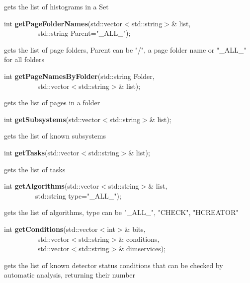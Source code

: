  gets the list of histograms in a Set


\item    int {\bf getPageFolderNames}(std::vector$<$std::string$>$\& list,\\\mbox{}~~~~~~~~~ std::string Parent="\_ALL\_");


 gets the list of page folders, Parent can be "/", a page folder name or "\_ALL\_" for all folders  


\item    int {\bf getPageNamesByFolder}(std::string Folder,\\\mbox{}~~~~~~~~~
			   std::vector$<$std::string$>$\& list);

 gets the list of pages in a folder


\item    int {\bf getSubsystems}(std::vector$<$std::string$>$\& list);


 gets the list of known subsystems


\item    int {\bf getTasks}(std::vector$<$std::string$>$\& list);


 gets the list of tasks


\item    int {\bf getAlgorithms}(std::vector$<$std::string$>$\& list,\\\mbox{}~~~~~~~~~std::string type="\_ALL\_");


 gets the list of algorithms, type can be "\_ALL\_", "CHECK", "HCREATOR"


\item    int {\bf getConditions}(std::vector$<$int$>$\& bits,\\\mbox{}~~~~~~~~~ 
                     std::vector$<$std::string$>$\& conditions,\\\mbox{}~~~~~~~~~
                     std::vector$<$std::string$>$\& dimservices);

 gets the list of known detector status conditions that can be checked by automatic analysis, returning their number


